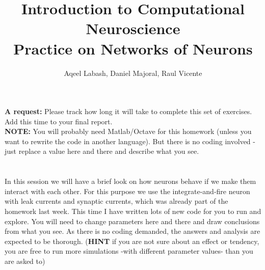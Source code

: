 \documentclass[a4paper,11pt]{article}
\author{\large{Aqeel Labash, Daniel Majoral, Raul Vicente}}
\title{\huge{Introduction to Computational Neuroscience}\\\LARGE{Practice on Networks of Neurons}}
\begin{document}
\maketitle

\textbf{A request:} Please track how long it will take to complete this set of exercises. Add this time to your final report.
\ \\

\textbf{NOTE:} You will probably need Matlab/Octave for this homework (unless you want to rewrite the code in another language). But there is no coding involved - just replace a value here and there and describe what you see.\\
\ \\
\ \\
%
%
In this session we will have a brief look on how neurons behave if we make them interact with each other. For this purpose we use the integrate-and-fire neuron with leak currents and synaptic currents, which was already part of the homework last week. This time I have written lots of new code for you to run and explore. You will need to change parameters here and there and draw conclusions from what you see. As there is no coding demanded, the answers and analysis are expected to be thorough. (\textbf{HINT} if you are not sure about an effect or tendency, you are free to run more simulations -with different parameter values- than you are asked to)

\ \\
\end{document}
